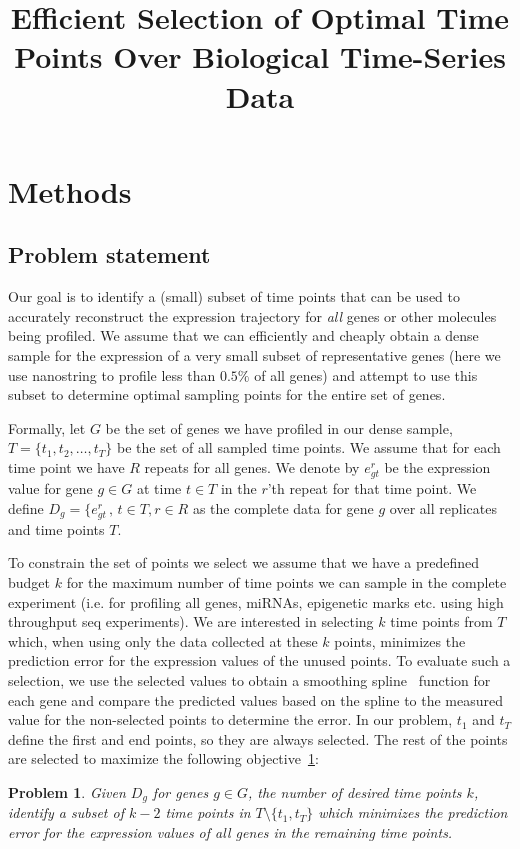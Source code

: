 \documentclass[10pt]{article}
\newtheorem{problem}{Problem}
\begin{document}
\title{Efficient Selection of Optimal Time Points Over Biological Time-Series Data}
\date{}

\maketitle

\section{Methods}

\subsection{Problem statement}
Our goal is to identify a (small) subset of time points that can be
used to accurately reconstruct the expression trajectory for {\em
all} genes or other molecules being profiled. We assume that we can
efficiently and cheaply obtain a dense sample for the expression of
a very small subset of representative genes (here we use nanostring
to profile less than $0.5\%$ of all genes) and attempt to use this
subset to determine optimal sampling points for the entire set of
genes.

Formally, let $G$ be the set of genes we have profiled in our dense
sample, $T = \{t_{1}, t_{2}, \ldots, t_{T}\}$ be the set of all
sampled time points. We assume that for each time point we have $R$
repeats for all genes. We denote by $e_{gt}^{r}$ be the expression
value for gene $g \in G$ at time $t \in T$ in the $r$'th repeat for
that time point. We define $D_{g} = \{e_{gt}^{r}\,,\, t \in T, r \in
R$ as the complete data for gene $g$ over all replicates and time
points $T$.

To constrain the set of points we select we assume that we have a
predefined budget $k$ for the maximum number of time points we can
sample in the complete experiment (i.e. for profiling all genes, miRNAs, epigenetic marks etc. using high throughput seq
experiments). We are interested in selecting $k$ time points from
$T$ which, when using only the data collected at these $k$ points,
minimizes the prediction error for the expression values of the
unused points. To evaluate such a selection, we use the selected
values to obtain a smoothing spline~\cite{deboor, bar2003,
wahba1990} function for each gene and compare the predicted values
based on the spline to the measured value for the non-selected
points to determine the error. In our problem, $t_{1}$ and $t_{T}$
define the first and end points, so they are always selected. The
rest of the points are selected to maximize the following
objective~\ref{prob:prob1}:
%
\begin{problem}\label{prob:prob1}
Given $D_{g}$ for genes $g \in G$, the number of desired time points
$k$, identify a subset of $k-2$ time points in $T \setminus \{t_{1},
t_{T}\}$ which minimizes the prediction error for the expression
values of all genes in the remaining time points.
\end{problem}
\end{document}
